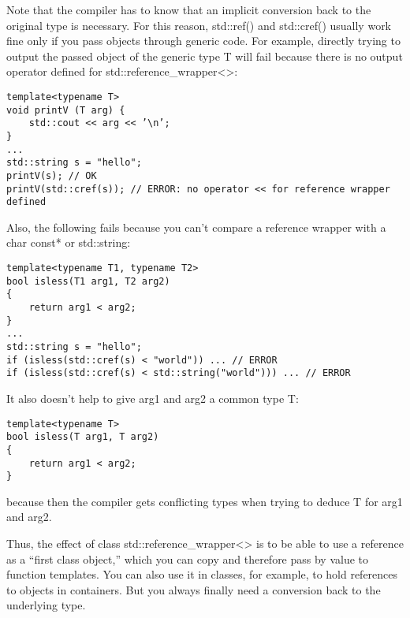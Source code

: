 Note that the compiler has to know that an implicit conversion back to the original type is necessary. For this reason, std::ref() and std::cref() usually work fine only if you pass objects through generic code. For example, directly trying to output the passed object of the generic type T will fail because there is no output operator defined for std::reference\_wrapper<>:

\begin{lstlisting}[style=styleCXX]
template<typename T>
void printV (T arg) {
	std::cout << arg << ’\n’;
}
...
std::string s = "hello";
printV(s); // OK
printV(std::cref(s)); // ERROR: no operator << for reference wrapper defined
\end{lstlisting}

Also, the following fails because you can’t compare a reference wrapper with a char const* or std::string:

\begin{lstlisting}[style=styleCXX]
template<typename T1, typename T2>
bool isless(T1 arg1, T2 arg2)
{
	return arg1 < arg2;
}
...
std::string s = "hello";
if (isless(std::cref(s) < "world")) ... // ERROR
if (isless(std::cref(s) < std::string("world"))) ... // ERROR
\end{lstlisting}

It also doesn’t help to give arg1 and arg2 a common type T:

\begin{lstlisting}[style=styleCXX]
template<typename T>
bool isless(T arg1, T arg2)
{
	return arg1 < arg2;
}
\end{lstlisting}

because then the compiler gets conflicting types when trying to deduce T for arg1 and arg2.

Thus, the effect of class std::reference\_wrapper<> is to be able to use a reference as a “first class object,” which you can copy and therefore pass by value to function templates. You can also use it in classes, for example, to hold references to objects in containers. But you always finally need a conversion back to the underlying type.












